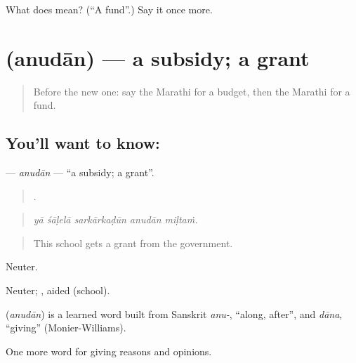 \begin{tcolorbox}[breakable,colback=teal!4,colframe=teal!35!black,title={Before you move on}]
What does  mean? (\textquotedblleft{}A fund\textquotedblright{}.) Say it once more.
\end{tcolorbox}
\section[\texorpdfstring{\mr{अनुदान} (anudān)}{अनुदान (anudān)}]{ (anudān) — a subsidy; a grant}

\label{lesson:MR-C361-anudan}



\begin{quote}
Before the new one: say the Marathi for a budget, then the Marathi for a fund.
\end{quote}

\subsection*{You'll want to know: }
\textbf{} — \emph{anudān} — \textquotedblleft{}a subsidy; a grant\textquotedblright{}.

\begin{quote}
    .
\end{quote}

\begin{quote}
\emph{yā śāḷelā sarkārkaḍūn anudān miḷtaṁ.}
\end{quote}

\begin{quote}
This school gets a grant from the government.
\end{quote}

Neuter.

Neuter; , aided (school).

\begin{cousinweb}
\textbf{} (\emph{anudān}) is a learned word built from Sanskrit \emph{anu-}, \textquotedblleft{}along, after\textquotedblright{}, and \emph{dāna}, \textquotedblleft{}giving\textquotedblright{} (Monier-Williams).
\end{cousinweb}

\begin{grammarlens}[title={What you've built}]
One more word for giving reasons and opinions.
\end{grammarlens}

